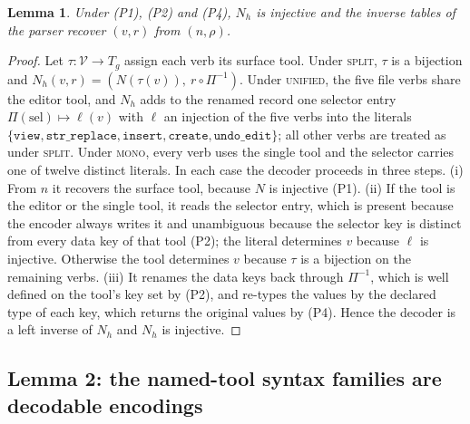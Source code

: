 \documentclass{article} %
\newtheorem{lemma}{Lemma}
\begin{document}
\begin{lemma}\label{lem:naming}
Under (P1), (P2) and (P4), $N_h$ is injective and the
inverse tables of the parser recover $(v,r)$ from $(n,\rho)$.
\end{lemma}
\begin{proof}
Let $\tau:\mathcal{V}\to T_g$ assign each verb its surface tool.
Under \textsc{split}, $\tau$ is a bijection and $N_h(v,r)=(N(\tau(v)),\
r\circ\Pi^{-1})$. Under \textsc{unified}, the five file verbs share the editor
tool, and $N_h$ adds to the renamed record one selector entry
$\Pi(\mathrm{sel})\mapsto\ell(v)$ with $\ell$ an injection of the five verbs
into the literals $\{\texttt{view},\texttt{str\_replace},\texttt{insert},
\texttt{create},\texttt{undo\_edit}\}$; all other verbs are treated as under
\textsc{split}. Under \textsc{mono}, every verb uses the single tool and the
selector carries one of twelve distinct literals. In each case the decoder
proceeds in three steps. (i) From $n$ it recovers the surface tool, because $N$
is injective (P1). (ii) If the tool is the editor or the single tool, it reads
the selector entry, which is present because the encoder always writes it and
unambiguous because the selector key is distinct from every data key of that
tool (P2); the literal determines $v$ because $\ell$ is injective. Otherwise
the tool determines $v$ because $\tau$ is a bijection on the remaining verbs.
(iii) It renames the data keys back through $\Pi^{-1}$, which is well defined
on the tool's key set by (P2), and re-types the values by the declared type
of each key, which returns the original values by (P4). Hence the decoder is a
left inverse of $N_h$ and $N_h$ is injective.
\end{proof}

\subsection{Lemma 2: the named-tool syntax families are decodable encodings}
\label{app:named}
\end{document}
